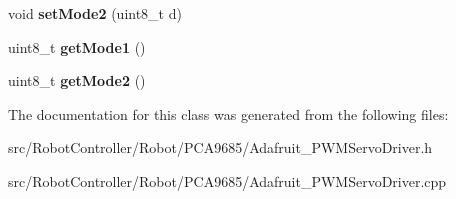 \begin{DoxyCompactItemize}
\item 
\hypertarget{class_adafruit___p_w_m_servo_driver_a0e51482c147ec76813341892091d18ab}{void {\bfseries set\+Mode2} (uint8\+\_\+t d)}\label{class_adafruit___p_w_m_servo_driver_a0e51482c147ec76813341892091d18ab}

\item 
\hypertarget{class_adafruit___p_w_m_servo_driver_ad74f59e73b2f52911b8a69ec6fa6788b}{uint8\+\_\+t {\bfseries get\+Mode1} ()}\label{class_adafruit___p_w_m_servo_driver_ad74f59e73b2f52911b8a69ec6fa6788b}

\item 
\hypertarget{class_adafruit___p_w_m_servo_driver_a0ae24a72a3d38414f9be4f4956c43485}{uint8\+\_\+t {\bfseries get\+Mode2} ()}\label{class_adafruit___p_w_m_servo_driver_a0ae24a72a3d38414f9be4f4956c43485}

\end{DoxyCompactItemize}


The documentation for this class was generated from the following files\+:\begin{DoxyCompactItemize}
\item 
src/\+Robot\+Controller/\+Robot/\+P\+C\+A9685/Adafruit\+\_\+\+P\+W\+M\+Servo\+Driver.\+h\item 
src/\+Robot\+Controller/\+Robot/\+P\+C\+A9685/Adafruit\+\_\+\+P\+W\+M\+Servo\+Driver.\+cpp\end{DoxyCompactItemize}
